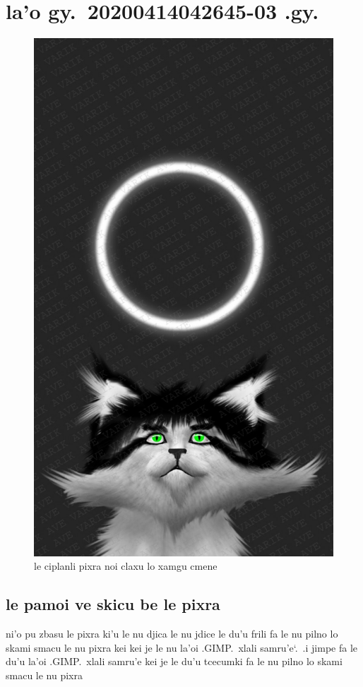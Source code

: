 \documentclass{report}
\newcommand\sds{\spacefactor\sfcode`.\ \space}
\begin{document}
\chapter{la'o gy.\ 20200414042645-03 .gy.}
\begin{figure}[ht]
	\centering
	\includegraphics[keepaspectratio, width=\textwidth, height=0.75\textheight]{20200414042645-03/20200414042645-03.jpg}
	\caption[center]{le ciplanli pixra noi claxu lo xamgu cmene}
\end{figure}
\section{le pamoi ve skicu be le pixra}
ni'o pu zbasu le pixra ki'u le nu djica le nu jdice le du'u frili fa le nu pilno lo skami smacu le nu pixra kei kei je le nu la'oi .GIMP.\ xlali samru'e\sds  .i jimpe fa le du'u la'oi .GIMP.\ xlali samru'e kei je le du'u tcecumki fa le nu pilno lo skami smacu le nu pixra
\end{document}
